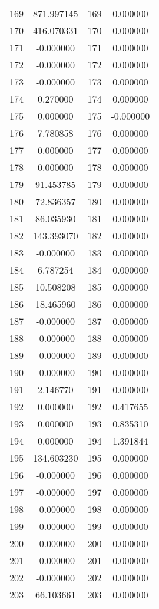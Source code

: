\documentclass[12pt]{article}
\begin{document}
\begin{longtable}{@{}cccc@{}}
169 & 871.997145 & 169 & 0.000000 \\
170 & 416.070331 & 170 & 0.000000 \\
171 & -0.000000 & 171 & 0.000000 \\
172 & -0.000000 & 172 & 0.000000 \\
173 & -0.000000 & 173 & 0.000000 \\
174 & 0.270000 & 174 & 0.000000 \\
175 & 0.000000 & 175 & -0.000000 \\
176 & 7.780858 & 176 & 0.000000 \\
177 & 0.000000 & 177 & 0.000000 \\
178 & 0.000000 & 178 & 0.000000 \\
179 & 91.453785 & 179 & 0.000000 \\
180 & 72.836357 & 180 & 0.000000 \\
181 & 86.035930 & 181 & 0.000000 \\
182 & 143.393070 & 182 & 0.000000 \\
183 & -0.000000 & 183 & 0.000000 \\
184 & 6.787254 & 184 & 0.000000 \\
185 & 10.508208 & 185 & 0.000000 \\
186 & 18.465960 & 186 & 0.000000 \\
187 & -0.000000 & 187 & 0.000000 \\
188 & -0.000000 & 188 & 0.000000 \\
189 & -0.000000 & 189 & 0.000000 \\
190 & -0.000000 & 190 & 0.000000 \\
191 & 2.146770 & 191 & 0.000000 \\
192 & 0.000000 & 192 & 0.417655 \\
193 & 0.000000 & 193 & 0.835310 \\
194 & 0.000000 & 194 & 1.391844 \\
195 & 134.603230 & 195 & 0.000000 \\
196 & -0.000000 & 196 & 0.000000 \\
197 & -0.000000 & 197 & 0.000000 \\
198 & -0.000000 & 198 & 0.000000 \\
199 & -0.000000 & 199 & 0.000000 \\
200 & -0.000000 & 200 & 0.000000 \\
201 & -0.000000 & 201 & 0.000000 \\
202 & -0.000000 & 202 & 0.000000 \\
203 & 66.103661 & 203 & 0.000000 \\

\end{longtable}
\end{document}
